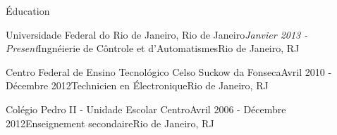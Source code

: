 \documentclass{resume} %
\begin{document}

\begin{rSection}{Éducation}

\begin{rSubsection}{Universidade Federal do Rio de Janeiro, Rio de Janeiro}{\em Janvier 2013 - Present}{Ingnéierie de Côntrole et d'Automatismes}{Rio de Janeiro, RJ}
\item
	
	
\end{rSubsection}


\begin{rSubsection}{Centro Federal de Ensino Tecnológico Celso Suckow da Fonseca}{Avril 2010 - Décembre 2012}{Technicien en Électronique}{Rio de Janeiro, RJ}
\item
	
\end{rSubsection}

\begin{rSubsection}{Colégio Pedro II - Unidade Escolar Centro}{Avril 2006 - Décembre 2012}{Enseignement secondaire}{Rio de Janeiro, RJ}
\item
	
\end{rSubsection}

\end{rSection}

\end{document}
